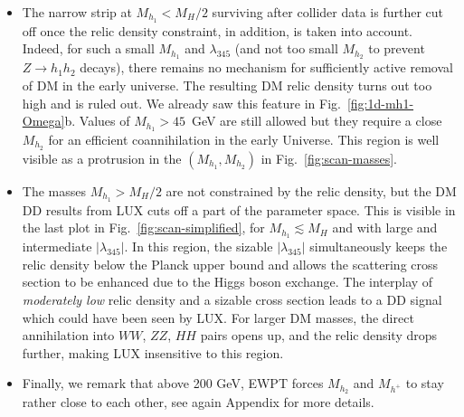 \documentclass[12pt,a4paper]{article}
\begin{document}
\begin{itemize}
\item The narrow strip at $M_{h_1}<M_H/2$ surviving after collider data is further cut off once the relic density constraint, in addition,
is taken into account. Indeed, for such a small $M_{h_1}$ and $\lambda_{345}$
(and not too small $M_{h_2}$ to prevent $Z \to h_1 h_2$ decays), 
there remains no mechanism for sufficiently active removal of DM 
in the early universe. The resulting DM relic density turns out too high and is ruled out. We already saw this feature 
in Fig.~\ref{fig:1d-mh1-Omega}b. Values of $M_{h_1} > 45$~GeV are still allowed but they require
a close $M_{h_2}$ for an efficient coannihilation in the early Universe.
This region is well visible as a protrusion in the $(M_{h_1},M_{h_2})$ in Fig.~\ref{fig:scan-masses}.

\item The masses $M_{h_1} > M_H/2$ are not constrained by the relic density,
but the DM DD results from LUX cuts off a part of the parameter space.
This is visible in the last plot in Fig.~\ref{fig:scan-simplified},
for $M_{h_1}\lesssim M_H$ and with large and intermediate $|\lambda_{345}|$.
In this region, the sizable $|\lambda_{345}|$ simultaneously keeps the relic density below the Planck upper bound
and allows the scattering cross section to be enhanced due to the Higgs boson exchange.
The interplay of {\em moderately low} relic density and a sizable cross section leads to a DD signal
which could have been seen by LUX.
For larger DM masses, the direct annihilation into $WW$, $ZZ$, $HH$ pairs opens up,
and the relic density drops further, making LUX insensitive to this region.

\item Finally, we remark that above 200 GeV, EWPT forces $M_{h_2}$ and $M_{h^{+}}$ to stay rather close
to each other, see again Appendix for more details.

\end{itemize}
\end{document}
